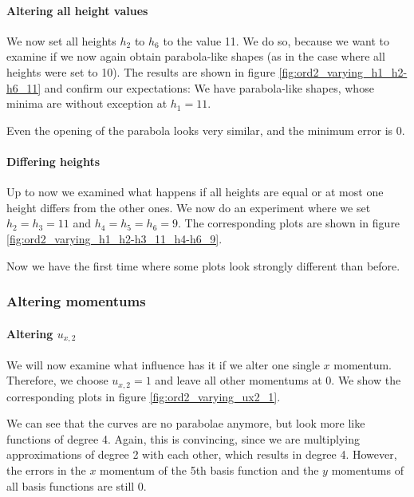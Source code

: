\documentclass{article}
\begin{document}
\paragraph{Altering all height values}

We now set all heights $h_2$ to $h_6$ to the value 11. We do so, because we want to examine if we now again obtain parabola-like shapes (as in the case where all heights were set to 10). The results are shown in figure \ref{fig:ord2_varying_h1_h2-h6_11} and confirm our expectations: We have parabola-like shapes, whose minima are without exception at $h_1=11$.



Even the opening of the parabola looks very similar, and the minimum error is 0.

\paragraph{Differing heights}

Up to now we examined what happens if all heights are equal or at most one height differs from the other ones. We now do an experiment where we set $h_2=h_3=11$ and $h_4=h_5=h_6=9$. The corresponding plots are shown in figure \ref{fig:ord2_varying_h1_h2-h3_11_h4-h6_9}.



Now we have the first time where some plots look strongly different than before.

\clearpage{}

\subsubsection{Altering momentums}
\label{sec:stiffness-analysis-ord2-altering-momentums}

\paragraph{\texorpdfstring{Altering $u_{x,2}$}{Altering ux2}}

We will now examine what influence has it if we alter one single $x$ momentum. Therefore, we choose $u_{x,2}=1$ and leave all other momentums at 0. We show the corresponding plots in figure \ref{fig:ord2_varying_ux2_1}.



We can see that the curves are no parabolae anymore, but look more like functions of degree 4. Again, this is convincing, since we are multiplying approximations of degree 2 with each other, which results in degree 4. However, the errors in the $x$ momentum of the 5th basis function and the $y$ momentums of all basis functions are still 0.
\end{document}
